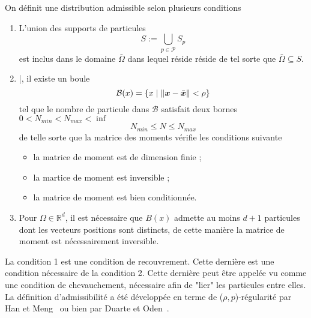 \begin{definition}
    On définit une distribution admissible selon plusieurs conditions
    \begin{enumerate}
        \item L'union des supports de particules
              \begin{equation*}
                  S:= \bigcup_{p \in \mathcal P} S_p
              \end{equation*}
              est inclus dans le domaine $\bar \Omega$ dans lequel réside réside de tel sorte que $\bar \Omega	\subseteq S$.
        \item \forall \bx \in \bar \Omega, il existe un boule %
              \begin{equation}
                  \mathcal B(x) = \{x \mid \|\bm{x} - \bar {\bm{x}}\| < \rho\}
              \end{equation}tel que le nombre de particule dans $\mathcal B$ satisfait deux bornes $0 < N_{min} < N_{max} < \inf$
              \begin{equation*}
                  N_{min} \leq N \leq N_{max}
              \end{equation*} de telle sorte que la matrice des moments vérifie les conditions suivante
              \begin{itemize}
                  \item la matrice de moment est de dimension finie ;
                  \item la martice de moment est inversible ;
                  \item la matrice de moment est bien conditionnée.
              \end{itemize}
        \item Pour $\Omega \in \mathbb R^d$, il est nécessaire que $B(x)$ admette au moins $d+1$ particules dont les vecteurs positions sont distincts, de cette manière la matrice de moment est nécessairement inversible.
    \end{enumerate}
\end{definition}

La condition 1 est une condition de recouvrement. Cette dernière est une condition nécessaire de la condition 2. Cette dernière peut être appelée vu comme une condition de chevauchement, nécessaire afin de "lier" les particules entre elles. La définition d'admissibilité a été développée en terme de ($\rho, p$)-régularité par Han et Meng~\cite{HAN20016157} ou bien par Duarte et Oden~\cite{duarte1996hp}.

